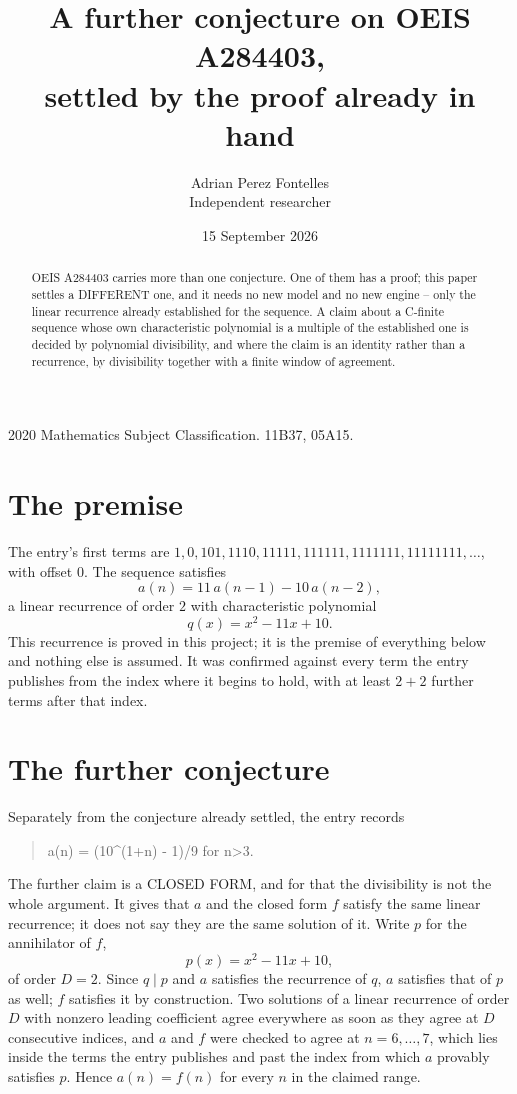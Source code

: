 \documentclass[11pt,a4paper]{article}
\title{A further conjecture on OEIS A284403,\\ \large settled by the proof already in hand}
\author{Adrian Perez Fontelles\\ \small Independent researcher}
\date{15 September 2026}
\theoremstyle{plain}
\theoremstyle{definition}
\begin{document}
\maketitle

\begin{abstract}
OEIS A284403 carries more than one conjecture. One of them has a proof; this paper settles a
DIFFERENT one, and it needs no new model and no new engine -- only the linear recurrence already
established for the sequence. A claim about a C-finite sequence whose own characteristic
polynomial is a multiple of the established one is decided by polynomial divisibility, and where
the claim is an identity rather than a recurrence, by divisibility together with a finite window
of agreement.
\end{abstract}

\noindent\small 2020 Mathematics Subject Classification. 11B37, 05A15.\normalsize

\section{The premise}

The entry's first terms are $1, 0, 101, 1110, 11111, 111111, 1111111, 11111111,\dots$, with offset $0$. The sequence satisfies
\[
  a(n)=11\,a(n-1) - 10\,a(n-2) ,
\]
a linear recurrence of order $2$ with characteristic polynomial
\[
  q(x)=x^{2} - 11 x + 10 .
\]
This recurrence is proved in this project; it is the premise of everything below and nothing else is assumed.
It was confirmed against every term the entry publishes from the index where it begins to hold,
with at least $2+2$ further terms after that index.

\section{The further conjecture}

Separately from the conjecture already settled, the entry records

\begin{quote}\raggedright a(n) = (10\^{}(1+n) - 1)/9 for n>3.\end{quote}

The further claim is a CLOSED FORM, and for that the divisibility is not the whole argument. It
gives that $a$ and the closed form $f$ satisfy the same linear recurrence; it does not say they
are the same solution of it. Write $p$ for the annihilator of $f$,
\[
  p(x)=x^{2} - 11 x + 10 ,
\]
of order $D=2$. Since $q\mid p$ and $a$ satisfies the recurrence of $q$, $a$ satisfies that of
$p$ as well; $f$ satisfies it by construction. Two solutions of a linear recurrence of order $D$
with nonzero leading coefficient agree everywhere as soon as they agree at $D$ consecutive
indices, and $a$ and $f$ were checked to agree at $n=6,\dots,7$,
which lies inside the terms the entry publishes and past the index from which $a$ provably
satisfies $p$. Hence $a(n)=f(n)$ for every $n$ in the claimed range.
\end{document}
